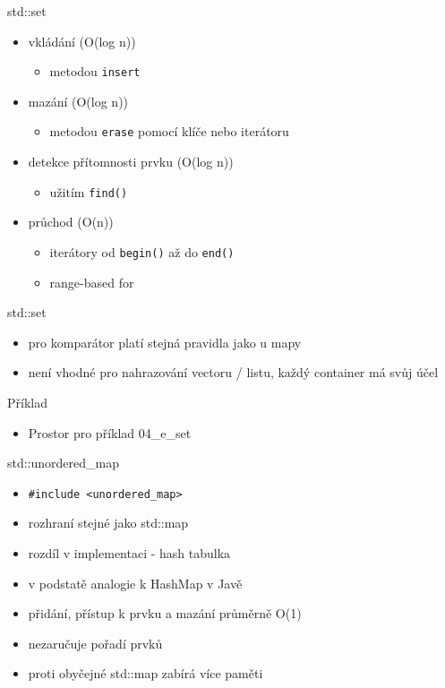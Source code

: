 \documentclass{beamer}
\begin{document}
\begin{xframe}{std::set}
	\begin{itemize}
		\item vkládání (O(log n))
			\begin{itemize}
				\item metodou \texttt{insert}
			\end{itemize}
		\item mazání (O(log n))
			\begin{itemize}
				\item metodou \texttt{erase} pomocí klíče nebo iterátoru
			\end{itemize}
		\item detekce přítomnosti prvku (O(log n))
			\begin{itemize}
				\item užitím \texttt{find()}
			\end{itemize}
		\item průchod (O(n))
			\begin{itemize}
				\item iterátory od \texttt{begin()} až do \texttt{end()}
				\item range-based for
			\end{itemize}
	\end{itemize}
\end{xframe}

\begin{xframe}{std::set}
	\begin{itemize}
		\item pro komparátor platí stejná pravidla jako u mapy
		\item není vhodné pro nahrazování vectoru / listu, každý container má svůj účel
	\end{itemize}
\end{xframe}

\begin{xframe}{Příklad}
	\begin{itemize}
		\item Prostor pro příklad 04\_e\_set
	\end{itemize}
\end{xframe}


\begin{xframe}{std::unordered\_map}
	\begin{itemize}
		\item \texttt{\#include <unordered\_map>}
		\item rozhraní stejné jako std::map
		\item rozdíl v implementaci - hash tabulka
		\item v podstatě analogie k HashMap v Javě
		\item přidání, přístup k prvku a mazání průměrně O(1)
		\item nezaručuje pořadí prvků
		\item proti obyčejné std::map zabírá více paměti
	\end{itemize}
\end{xframe}
\end{document}
